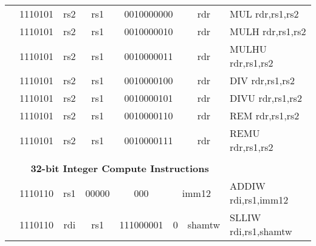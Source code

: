\begin{table}[p]
\begin{small}
\begin{center}
\begin{tabular}{rcccccccccl}
&
\multicolumn{2}{|c|}{1110101} &
\multicolumn{1}{c|}{rs2} &
\multicolumn{1}{c|}{rs1} &
\multicolumn{4}{c|}{0010000000} &
\multicolumn{1}{c|}{rdr} & MUL rdr,rs1,rs2 \\
\cline{2-10}
  

&
\multicolumn{2}{|c|}{1110101} &
\multicolumn{1}{c|}{rs2} &
\multicolumn{1}{c|}{rs1} &
\multicolumn{4}{c|}{0010000010} &
\multicolumn{1}{c|}{rdr} & MULH rdr,rs1,rs2 \\
\cline{2-10}
  

&
\multicolumn{2}{|c|}{1110101} &
\multicolumn{1}{c|}{rs2} &
\multicolumn{1}{c|}{rs1} &
\multicolumn{4}{c|}{0010000011} &
\multicolumn{1}{c|}{rdr} & MULHU rdr,rs1,rs2 \\
\cline{2-10}
  

&
\multicolumn{2}{|c|}{1110101} &
\multicolumn{1}{c|}{rs2} &
\multicolumn{1}{c|}{rs1} &
\multicolumn{4}{c|}{0010000100} &
\multicolumn{1}{c|}{rdr} & DIV rdr,rs1,rs2 \\
\cline{2-10}
  

&
\multicolumn{2}{|c|}{1110101} &
\multicolumn{1}{c|}{rs2} &
\multicolumn{1}{c|}{rs1} &
\multicolumn{4}{c|}{0010000101} &
\multicolumn{1}{c|}{rdr} & DIVU rdr,rs1,rs2 \\
\cline{2-10}
  

&
\multicolumn{2}{|c|}{1110101} &
\multicolumn{1}{c|}{rs2} &
\multicolumn{1}{c|}{rs1} &
\multicolumn{4}{c|}{0010000110} &
\multicolumn{1}{c|}{rdr} & REM rdr,rs1,rs2 \\
\cline{2-10}
  

&
\multicolumn{2}{|c|}{1110101} &
\multicolumn{1}{c|}{rs2} &
\multicolumn{1}{c|}{rs1} &
\multicolumn{4}{c|}{0010000111} &
\multicolumn{1}{c|}{rdr} & REMU rdr,rs1,rs2 \\
\cline{2-10}
  

&
\multicolumn{9}{c}{} & \\
&
\multicolumn{9}{c}{\bf 32-bit Integer Compute Instructions} & \\
\cline{2-10}
  

&
\multicolumn{2}{|c|}{1110110} &
\multicolumn{1}{c|}{rs1} &
\multicolumn{1}{c|}{00000} &
\multicolumn{1}{c|}{000} &
\multicolumn{4}{c|}{imm12} & ADDIW rdi,rs1,imm12 \\
\cline{2-10}
  

&
\multicolumn{2}{|c|}{1110110} &
\multicolumn{1}{c|}{rdi} &
\multicolumn{1}{c|}{rs1} &
\multicolumn{3}{c|}{111000001} &
\multicolumn{1}{c|}{0} &
\multicolumn{1}{c|}{shamtw} & SLLIW rdi,rs1,shamtw \\
\cline{2-10}
  


\end{tabular}
\end{center}
\end{small}
\end{table}
